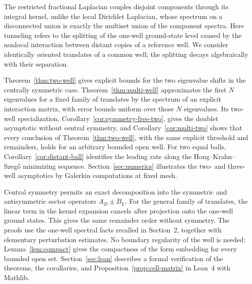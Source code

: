 \documentclass[twoside,10pt]{article}
\numberwithin{equation}{section}
\theoremstyle{slbody}
\theoremstyle{definition}
\begin{document}
The restricted fractional Laplacian couples disjoint components through its
integral kernel, unlike the local Dirichlet Laplacian, whose spectrum on a
disconnected union is exactly the multiset union of the component spectra.
Here tunneling refers to the splitting of the one-well ground-state level
caused by the nonlocal interaction between distant copies of a reference
well.  We consider identically oriented translates of a common well; the
splitting decays algebraically with their separation.

Theorem~\ref{thm:two-well} gives explicit bounds for the two eigenvalue shifts
in the centrally symmetric case.  Theorem~\ref{thm:multi-well} approximates
the first $N$ eigenvalues for a fixed family of translates by the spectrum
of an explicit interaction matrix, with error bounds uniform over those
$N$ eigenvalues.  Its two-well specialization,
Corollary~\ref{cor:symmetry-free-two}, gives the doublet asymptotic without
central symmetry, and Corollary~\ref{cor:multi-two} shows that every
conclusion of Theorem~\ref{thm:two-well}, with the same explicit threshold and
remainders, holds for an arbitrary bounded open well.  For two equal balls,
Corollary~\ref{cor:distant-ball}
identifies the leading rate along the Hong--Krahn--Szeg\H{o} minimizing
sequence.  Section~\ref{sec:numerics} illustrates the two- and three-well
asymptotics by Galerkin computations at fixed mesh.

Central symmetry permits an exact decomposition into the symmetric and
antisymmetric sector operators $A_D\pm B_L$.  For the general family of
translates, the linear term in the kernel expansion cancels after projection
onto the one-well ground states.  This gives the same remainder order without
symmetry.  The proofs use the one-well spectral facts recalled in Section~2,
together with elementary perturbation estimates.  No boundary regularity of
the well is needed: Lemma~\ref{lem:compact} gives the compactness of the form
embedding for every bounded open set.  Section~\ref{sec:lean} describes a
formal verification of the theorems, the corollaries, and
Proposition~\ref{prop:cell-matrix} in Lean~4 with Mathlib.
\end{document}

